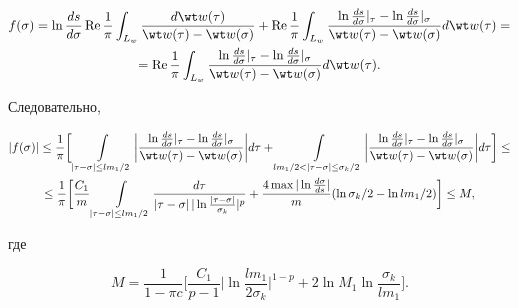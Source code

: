\begin{multline*}


f(\sigma) = \ln \frac{ds}{d\sigma} \re \frac{1}{\pi} \int_{L_w}


\frac{d\wt w(\tau)}{\wt w(\tau) - \wt w(\sigma)} +


\re \frac{1}{\pi}


\int_{L_w} \frac{\ln\frac{ds}{d\sigma}|_{\tau} -


\ln\frac{ds}{d\sigma}|_{\sigma}}{\wt w(\tau) - \wt w(\sigma)}


d\wt w(\tau) = \\


=\re \frac{1}{\pi} \int_{L_w}\frac{\ln\frac{ds}{d\sigma}|_{\tau} - 


\ln\frac{ds}{d\sigma}|_{\sigma}}{\wt w(\tau) - \wt w(\sigma)}


d\wt w(\tau).


\end{multline*}


Следовательно,


\begin{multline*}


|f(\sigma)| \leq \frac{1}{\pi} \bigg[ \int\limits_{|\tau - \sigma|


\leq lm_1/2} \bigg|\frac{\ln \frac{ds}{d\sigma} |_{\tau} -


\ln\frac{ds}{d\sigma}|_{\sigma}}{\wt w(\tau) - \wt w(\sigma)}\bigg| d\tau +


\int\limits_{lm_1/2 < |\tau - \sigma| \leq \sigma_k /2}


\bigg|\frac{\ln \frac{ds}{d\sigma} |_{\tau} -


\ln\frac{ds}{d\sigma} |_{\sigma} }{\wt w(\tau) - \wt w(\sigma)}\bigg|


d\tau \bigg] \leq \\


%


\leq \frac{1}{\pi}\bigg[ \frac{C_1}{m}\int\limits_{|\tau - \sigma| \leq


lm_1/2}


\frac{d\tau}{|\tau - \sigma|\,|\ln\frac{|\tau - \sigma|}{\sigma_k}|^p} +


\frac{4 \max |\ln\frac{d\sigma}{ds}|}{m} (\ln \sigma_k/2 - \ln


lm_1/2) \bigg] \leq M,


\end{multline*}


где


\begin{equation}


M = \frac{1}{1 - \pi c} \bigg[\frac{C_1}{p-1}\bigg|


\ln \frac{lm_1}{2\sigma_k}\bigg|^{1-


p} + 2 \ln M_1 \ln\frac{\sigma_k}{lm_1}\bigg].


\end{equation}





